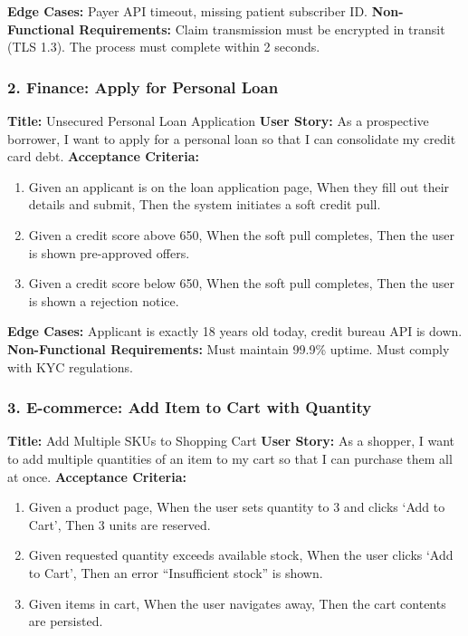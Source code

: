 \documentclass[
  11pt,
  openany,
  oneside]{book}
\providecommand{\tightlist}{%
  \setlength{\itemsep}{0pt}\setlength{\parskip}{0pt}}
\begin{document}
\textbf{Edge Cases:} Payer API timeout, missing patient subscriber ID.
\textbf{Non-Functional Requirements:} Claim transmission must be
encrypted in transit (TLS 1.3). The process must complete within 2
seconds.

\subsubsection{2. Finance: Apply for Personal
Loan}\label{finance-apply-for-personal-loan}

\textbf{Title:} Unsecured Personal Loan Application \textbf{User Story:}
As a prospective borrower, I want to apply for a personal loan so that I
can consolidate my credit card debt. \textbf{Acceptance Criteria:}

\begin{enumerate}
\def\labelenumi{\arabic{enumi}.}
\tightlist
\item
  Given an applicant is on the loan application page, When they fill out
  their details and submit, Then the system initiates a soft credit
  pull.
\item
  Given a credit score above 650, When the soft pull completes, Then the
  user is shown pre-approved offers.
\item
  Given a credit score below 650, When the soft pull completes, Then the
  user is shown a rejection notice.
\end{enumerate}

\textbf{Edge Cases:} Applicant is exactly 18 years old today, credit
bureau API is down. \textbf{Non-Functional Requirements:} Must maintain
99.9\% uptime. Must comply with KYC regulations.

\subsubsection{3. E-commerce: Add Item to Cart with
Quantity}\label{e-commerce-add-item-to-cart-with-quantity}

\textbf{Title:} Add Multiple SKUs to Shopping Cart \textbf{User Story:}
As a shopper, I want to add multiple quantities of an item to my cart so
that I can purchase them all at once. \textbf{Acceptance Criteria:}

\begin{enumerate}
\def\labelenumi{\arabic{enumi}.}
\tightlist
\item
  Given a product page, When the user sets quantity to 3 and clicks `Add
  to Cart', Then 3 units are reserved.
\item
  Given requested quantity exceeds available stock, When the user clicks
  `Add to Cart', Then an error ``Insufficient stock'' is shown.
\item
  Given items in cart, When the user navigates away, Then the cart
  contents are persisted.
\end{enumerate}
\end{document}
